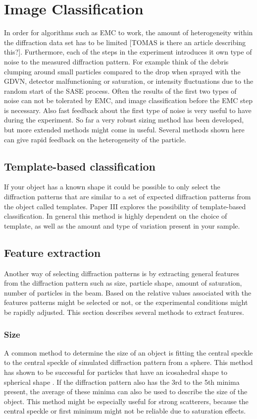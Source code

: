 \chapter{Image Classification}
In order for algorithms such as EMC to work, the amount of heterogeneity within the diffraction data set has to be limited [TOMAS is there an article describing this?]. Furthermore, each of the steps in the experiment introduces it own type of noise to the measured diffraction pattern. For example think of the debris clumping around small particles compared to the drop when sprayed with the GDVN, detector malfunctioning or saturation, or intensity fluctuations due to the random start of the SASE process. Often the results of the first two types of noise can not be tolerated by EMC, and image classification before the EMC step is necessary. Also fast feedback about the first type of noise is very useful to have during the experiment. So far a very robust sizing method has been developed, but more extended methods might come in useful. Several methods shown here can give rapid feedback on the heterogeneity of the particle.

\section{Template-based classification}
If your object has a known shape it could be possible to only select the diffraction patterns that are similar to a set of expected diffraction patterns from the object called templates. Paper III explores the possibility of template-based classification. In general this method is highly dependent on the choice of template, as well as the amount and type of variation present in your sample.

\section{Feature extraction}
Another way of selecting diffraction patterns is by extracting general features from the diffraction pattern such as size, particle shape, amount of saturation, number of particles in the beam. Based on the relative values associated with the features patterns might be selected or not, or the experimental conditions might be rapidly adjusted. This section describes several methods to extract features.

\subsection{Size}
A common method to determine the size of an object is fitting the central speckle to the central speckle of simulated diffraction pattern from a sphere. This method has shown to be successful for particles that have an icosahedral shape to spherical shape \cite{Hantke2014,Daurer2017}. If the diffraction pattern also has the 3rd to the 5th minima present, the average of these minima can also be used to describe the size of the object. This method might be especially useful for strong scatterers, because the central speckle or first minimum might not be reliable due to saturation effects.

